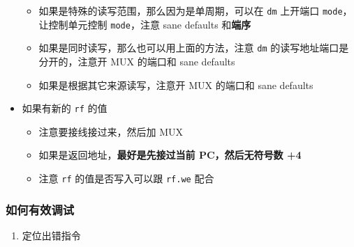 \begin{itemize}
  \begin{itemize}
  \tightlist
  \item
    如果是特殊的读写范围，那么因为是单周期，可以在 \texttt{dm} 上开端口
    \texttt{mode}，让控制单元控制 \texttt{mode}，注意 sane defaults
    和\textbf{端序}
  \item
    如果是同时读写，那么也可以用上面的方法，注意 \texttt{dm}
    的读写地址端口是分开的，注意开 MUX 的端口和 sane defaults
  \item
    如果是根据其它来源读写，注意开 MUX 的端口和 sane defaults
  \end{itemize}
\item
  如果有新的 \texttt{rf} 的值

  \begin{itemize}
  \tightlist
  \item
    注意要接线接过来，然后加 MUX
  \item
    如果是返回地址，\textbf{最好是先接过当前 PC，然后无符号数 +4}
  \item
    注意 \texttt{rf} 的值是否写入可以跟 \texttt{rf.we} 配合
  \end{itemize}
\end{itemize}

\hypertarget{ux5982ux4f55ux6709ux6548ux8c03ux8bd5}{%
\subsubsection{如何有效调试}\label{ux5982ux4f55ux6709ux6548ux8c03ux8bd5}}

\begin{enumerate}
\def\labelenumi{\arabic{enumi}.}
\tightlist
\item
  定位出错指令
\end{enumerate}

